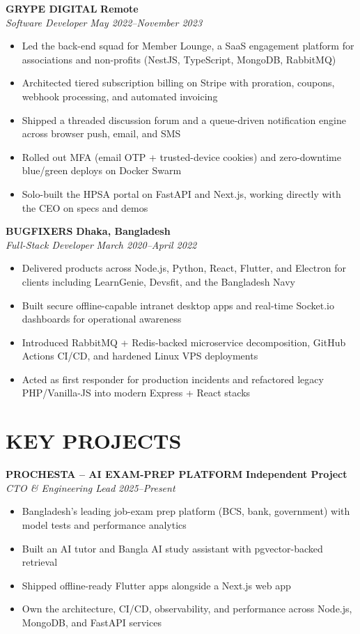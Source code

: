 \documentclass[11pt,letterpaper]{article}
\newcommand{\role}[4]{
  \begin{center}
  \textbf{#1} \hfill \textbf{#2} \\
  \textit{#3} \hfill \textit{#4}
  \end{center}
}
\begin{document}
\role{GRYPE DIGITAL}{Remote}{Software Developer}{May 2022--November 2023}
\begin{itemize}[leftmargin=*,nosep,topsep=0pt]
  \item Led the back-end squad for Member Lounge, a SaaS engagement platform for associations and non-profits (NestJS, TypeScript, MongoDB, RabbitMQ)
  \item Architected tiered subscription billing on Stripe with proration, coupons, webhook processing, and automated invoicing
  \item Shipped a threaded discussion forum and a queue-driven notification engine across browser push, email, and SMS
  \item Rolled out MFA (email OTP + trusted-device cookies) and zero-downtime blue/green deploys on Docker Swarm
  \item Solo-built the HPSA portal on FastAPI and Next.js, working directly with the CEO on specs and demos
\end{itemize}

\role{BUGFIXERS}{Dhaka, Bangladesh}{Full-Stack Developer}{March 2020--April 2022}
\begin{itemize}[leftmargin=*,nosep,topsep=0pt]
  \item Delivered products across Node.js, Python, React, Flutter, and Electron for clients including LearnGenie, Devsfit, and the Bangladesh Navy
  \item Built secure offline-capable intranet desktop apps and real-time Socket.io dashboards for operational awareness
  \item Introduced RabbitMQ + Redis-backed microservice decomposition, GitHub Actions CI/CD, and hardened Linux VPS deployments
  \item Acted as first responder for production incidents and refactored legacy PHP/Vanilla-JS into modern Express + React stacks
\end{itemize}

\vspace{1em}
\section{KEY PROJECTS}

\vspace{0.5em}
\role{PROCHESTA -- AI EXAM-PREP PLATFORM}{Independent Project}{CTO \& Engineering Lead}{2025--Present}
\begin{itemize}[leftmargin=*,nosep,topsep=0pt]
  \item Bangladesh's leading job-exam prep platform (BCS, bank, government) with model tests and performance analytics
  \item Built an AI tutor and Bangla AI study assistant with pgvector-backed retrieval
  \item Shipped offline-ready Flutter apps alongside a Next.js web app
  \item Own the architecture, CI/CD, observability, and performance across Node.js, MongoDB, and FastAPI services
\end{itemize}
\end{document}
